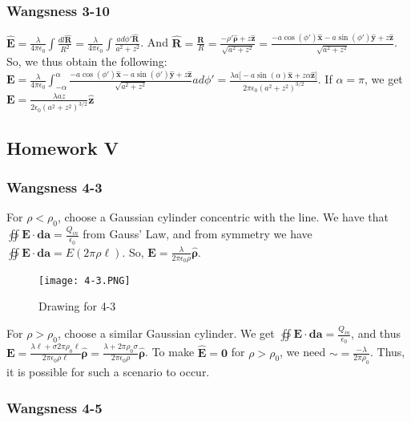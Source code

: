 \documentclass[oneside]{book}
\theoremstyle{definition}
\newcommand*\B[1]{\mathbf{#1}}
\newcommand*\Bh[1]{\mathbf{\hat{#1}}}
\begin{document}
\subsubsection{Wangsness 3-10}

$\Bh{E} = \frac{\lambda}{4\pi\epsilon_0} \int \frac{dl \Bh{R}}{R^2} = \frac{\lambda}{4\pi \epsilon_0} \int \frac{ad\phi' \Bh{R}}{a^2+z^2}$. And $\Bh{R} = \frac{\B{R}}{R} = \frac{-\rho' \Bh{\rho}+z\Bh{z}}{\sqrt{a^2+z^2}} = \frac{-a\cos(\phi')\Bh{x}-a\sin(\phi')\Bh{y}+z\Bh{z}}{\sqrt{a^2+z^2}}$. So, we thus obtain the following: \\ $\B{E} = \frac{\lambda}{4\pi \epsilon_0} \int_{-\alpha}^{\alpha} \frac{-a\cos(\phi')\Bh{x}-a\sin(\phi')\Bh{y}+z\Bh{z}}{\sqrt{a^2+z^2}}ad\phi' = \frac{\lambda a\big[ -a\sin(\alpha)\Bh{x}+z\alpha \Bh{z}\big]}{2\pi \epsilon_0 (a^2+z^2)^{3/2}}$. If $\alpha = \pi$, we get $\B{E} = \frac{\lambda a z}{2\epsilon_0 (a^2+z^2)^{3/2}}\Bh{z}$


\subsection*{Homework V}

\subsubsection{Wangsness 4-3}

For $\rho<\rho_0$, choose a Gaussian cylinder concentric with the line. We have that $\oiint \B{E}\cdot \B{da} = \frac{Q_{in}}{\epsilon_0}$ from Gauss' Law, and from symmetry we have $\oiint \B{E}\cdot \B{da} = E(2\pi \rho \ell)$. So, $\B{E} = \frac{\lambda}{2\pi \epsilon_0 \rho}\Bh{\rho}$.
\begin{figure}[h]
\begin{center}
\texttt{[image: 4-3.PNG]}
\end{center}
\caption{Drawing for 4-3}
\end{figure}

For $\rho>\rho_0$, choose a similar Gaussian cylinder. We get $\oiint \B{E}\cdot \B{da} = \frac{Q_{in}}{\epsilon_0}$, and thus $\B{E} = \frac{\lambda \ell + \sigma 2\pi \rho_0 \ell}{2\pi \epsilon_0 \rho \ell}\Bh{\rho} = \frac{\lambda+2\pi \rho_0 \sigma}{2\pi \epsilon_0 \rho}\Bh{\rho}$. To make $\Bh{E} = \B{0}$ for $\rho>\rho_0$, we need $\sim = \frac{-\lambda}{2\pi \rho_0}$. Thus, it is possible for such a scenario to occur.

\subsubsection{Wangsness 4-5}
\end{document}
